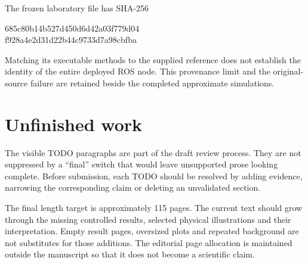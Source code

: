The frozen laboratory file has SHA-256
\begin{center}\footnotesize\ttfamily
685c80b14b527d450d6d42a03f779d04\\
f928a4e2d31d22b44c9733d7a98cbfba
\end{center}
Matching its executable methods to the supplied reference does not establish the identity of the entire deployed ROS node. This provenance limit and the original-source failure are retained beside the completed approximate simulations.


\section{Unfinished work}

The visible TODO paragraphs are part of the draft review process. They are not suppressed by a ``final'' switch that would leave unsupported prose looking complete. Before submission, each TODO should be resolved by adding evidence, narrowing the corresponding claim or deleting an unvalidated section.

The final length target is approximately 115 pages. The current text should grow through the missing controlled results, selected physical illustrations and their interpretation. Empty result pages, oversized plots and repeated background are not substitutes for those additions. The editorial page allocation is maintained outside the manuscript so that it does not become a scientific claim.



